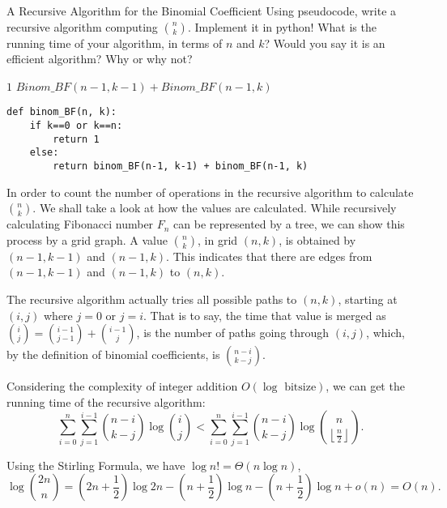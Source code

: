 \documentclass[UTF8, a4paper, linespread=1.5]{article}
\begin{document}
\newpage
\begin{thm}{A Recursive Algorithm for the Binomial Coefficient}{}
   Using pseudocode, write a recursive algorithm computing
  ${n \choose k}$. Implement it in python! What is 
  the running time of your algorithm, in terms of $n$ and $k$? Would you say it is an efficient
  algorithm? Why or why not?
\end{thm}

\begin{algorithm}
    \caption{Binom\_BF: A Recursive Algorithm for the Binomial Coefficient.}
    \begin{algorithmic}
        \RETURN $1$
        \ELSE
        \RETURN $Binom\_BF(n-1, k-1) + Binom\_BF(n-1, k)$
        \ENDIF
    \end{algorithmic}
\end{algorithm}

\begin{verbatim}
def binom_BF(n, k):
    if k==0 or k==n:
        return 1
    else:
        return binom_BF(n-1, k-1) + binom_BF(n-1, k)
\end{verbatim}

In order to count the number of operations in the recursive algorithm to calculate $\displaystyle \binom n k$. We shall take a look at how the values are calculated. While recursively calculating Fibonacci number $F_n$ can be represented by a tree, we can show this process by a grid graph. A value $\displaystyle \binom n k$, in grid $(n, k)$, is obtained by $(n-1, k-1)$ and $(n-1, k)$. This indicates that there are edges from $(n-1, k-1)$ and $(n-1, k)$ to $(n, k)$.

The recursive algorithm actually tries all possible paths to $(n, k)$, starting at $(i, j)$ where $j = 0$ or $j = i$. That is to say, the time that value is merged as $\displaystyle \binom i j = \binom {i-1}{j-1} + \binom {i-1} j$, is the number of paths going through $(i, j)$, which, by the definition of binomial coefficients, is $\displaystyle \binom {n-i}{k-j}$.

Considering the complexity of integer addition $O(\log \text{ bitsize})$, we can get the running time of the recursive algorithm: $$\sum_{i=0}^n\sum_{j=1}^{i-1} \binom {n-i}{k-j} \log  \binom i j < \sum_{i=0}^n\sum_{j=1}^{i-1} \binom {n-i}{k-j} \log  \binom n {\left\lfloor \frac{n}{2} \right\rfloor }.$$

Using the Stirling Formula, we have $\log n! = \Theta (n \log n)$,
$$\log \binom {2n}n = (2n+\frac{1}{2})\log 2n-(n+\frac{1}{2})\log n-(n+\frac{1}{2})\log n + o(n) = O(n).$$
\end{document}
